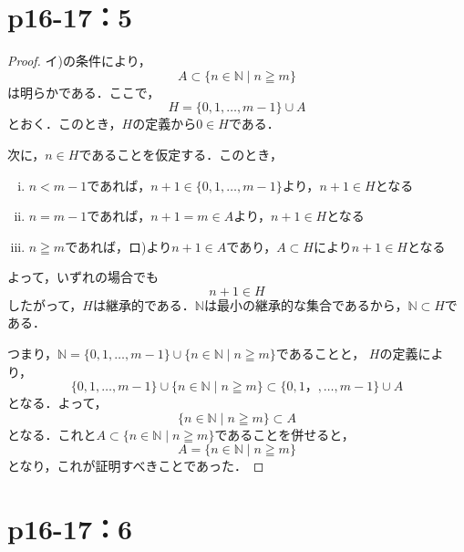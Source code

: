 \documentclass[a4paper,10pt,fleqn]{ltjsarticle}
\begin{document}
\newpage 

\section*{p16-17：5}

\begin{tleftbar}
	\begin{proof}
		イ)の条件により，
		\[ 
            A \subset \{n \in \mathbb{N} \mid n \geqq m\} 
        \]
		は明らかである．ここで，
		\[
        H=\{0,1,\dots,m-1\} \cup A
        \]
        とおく．このとき，$H$の定義から$0 \in H$である．

        次に，$n \in H$であることを仮定する．このとき，
        \begin{enumerate}[(i)]
        \item  $n<m-1$であれば，$n+1 \in \{0,1,\dots,m-1\}$より，$n+1 \in H$となる
		\item $n=m-1$であれば，$n+1=m \in A$より，$n+1 \in H$となる
		\item $n \geqq m$であれば，ロ)より$n+1 \in A$であり，$A \subset H $により$n + 1\in H$となる
		\end{enumerate}
		よって，いずれの場合でも
		\[
			n+1 \in H
		\]
		したがって，$H$は継承的である．$\mathbb{N}$は最小の継承的な集合であるから，$\mathbb{N} \subset H$である．

		つまり，$\mathbb{N} =  \{0,1,\dots,m-1\} \cup \{n \in \mathbb{N} \mid n \geqq m \}$であることと，
        $H$の定義により，
		\[
			 \{0,1,\dots,m-1\} \cup \{n \in \mathbb{N} \mid n \geqq m \} \subset \{0,1，,\dots,m-1\} \cup A
		\]
		となる．よって，
		\[
			\{n \in \mathbb{N}\mid n \geqq m \} \subset A
		\]
		となる．これと$ A \subset \{n \in \mathbb{N} \mid n \geqq m\}$であることを併せると，
		\[
			A=\{n \in \mathbb{N} \mid n \geqq m \}
		\]
        となり，これが証明すべきことであった．
	\end{proof}
\end{tleftbar}

\newpage 

\section*{p16-17：6}

\end{document}
